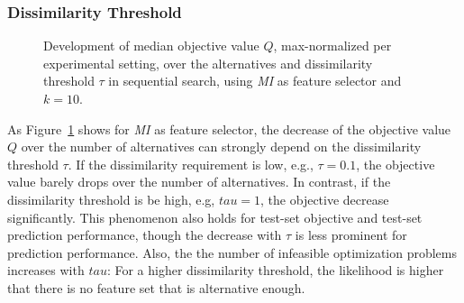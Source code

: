 \documentclass[conference]{IEEEtran}
\theoremstyle{definition}
\begin{document}
\subsubsection{Dissimilarity Threshold}

\begin{figure}[t]
	\centering
	\hfill
	\caption{Development of median objective value $Q$, max-normalized per experimental setting, over the alternatives and dissimilarity threshold $\tau$ in sequential search, using \emph{MI} as feature selector and $k=10$.}
	\label{fig:impact-num-alternatives-objective-tau}
\end{figure}

As Figure~\ref{fig:impact-num-alternatives-objective-tau} shows for \emph{MI} as feature selector, the decrease of the objective value $Q$ over the number of alternatives can strongly depend on the dissimilarity threshold $\tau$.
If the dissimilarity requirement is low, e.g., $\tau=0.1$, the objective value barely drops over the number of alternatives.
In contrast, if the dissimilarity threshold is be high, e.g, $tau=1$, the objective decrease significantly.
This phenomenon also holds for test-set objective and test-set prediction performance, though the decrease with $\tau$ is less prominent for prediction performance.
Also, the the number of infeasible optimization problems increases with $tau$:
For a higher dissimilarity threshold, the likelihood is higher that there is no feature set that is alternative enough.
\end{document}
